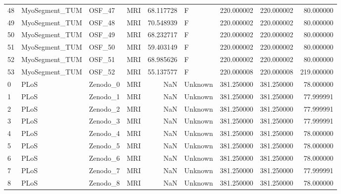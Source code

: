 \begin{tabular}{llllrlrrr}
48     &  MyoSegment\_TUM &       OSF\_47 &                MRI &  68.117728 &        F &       220.000002 &    220.000002 &   80.000000 \\
49     &  MyoSegment\_TUM &       OSF\_48 &                MRI &  70.548939 &        F &       220.000002 &    220.000002 &   80.000000 \\
50     &  MyoSegment\_TUM &       OSF\_49 &                MRI &  68.232717 &        F &       220.000002 &    220.000002 &   80.000000 \\
51     &  MyoSegment\_TUM &       OSF\_50 &                MRI &  59.403149 &        F &       220.000002 &    220.000002 &   80.000000 \\
52     &  MyoSegment\_TUM &       OSF\_51 &                MRI &  68.985626 &        F &       220.000002 &    220.000002 &   80.000000 \\
53     &  MyoSegment\_TUM &       OSF\_52 &                MRI &  55.137577 &        F &       220.000008 &    220.000008 &  219.000000 \\
0      &            PLoS &     Zenodo\_0 &                MRI &        NaN &  Unknown &       381.250000 &    381.250000 &   78.000000 \\
1      &            PLoS &     Zenodo\_1 &                MRI &        NaN &  Unknown &       381.250000 &    381.250000 &   77.999991 \\
2      &            PLoS &     Zenodo\_2 &                MRI &        NaN &  Unknown &       381.250000 &    381.250000 &   77.999991 \\
3      &            PLoS &     Zenodo\_3 &                MRI &        NaN &  Unknown &       381.250000 &    381.250000 &   77.999991 \\
4      &            PLoS &     Zenodo\_4 &                MRI &        NaN &  Unknown &       381.250000 &    381.250000 &   78.000000 \\
5      &            PLoS &     Zenodo\_5 &                MRI &        NaN &  Unknown &       381.250000 &    381.250000 &   78.000000 \\
6      &            PLoS &     Zenodo\_6 &                MRI &        NaN &  Unknown &       381.250000 &    381.250000 &   78.000000 \\
7      &            PLoS &     Zenodo\_7 &                MRI &        NaN &  Unknown &       381.250000 &    381.250000 &   77.999991 \\
8      &            PLoS &     Zenodo\_8 &                MRI &        NaN &  Unknown &       381.250000 &    381.250000 &   78.000000 \\

\end{tabular}
